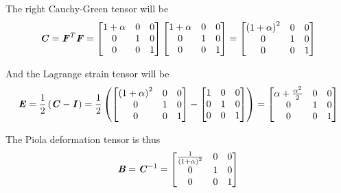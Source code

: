 The right Cauchy-Green tensor will be
\begin{equation}
  \boldsymbol{\mathit{C}} = {\boldsymbol{\mathit{F}}}^{T}\boldsymbol{\mathit{F}} = \begin{bmatrix}
    1+\alpha & 0 & 0 \\
    0 & 1 & 0 \\
    0 & 0 & 1
  \end{bmatrix} \begin{bmatrix}
    1+\alpha & 0 & 0 \\
    0 & 1 & 0 \\
    0 & 0 & 1
  \end{bmatrix} = \begin{bmatrix}
    \left( 1+\alpha \right)^2 & 0 & 0 \\
    0 & 1 & 0 \\
    0 & 0 & 1
  \end{bmatrix}
\end{equation}

And the Lagrange strain tensor will be
\begin{equation}
  \boldsymbol{\mathit{E}} = \frac{1}{2}\left( \boldsymbol{\mathit{C}}-\boldsymbol{\mathit{I}} \right) = \frac{1}{2}\left( \begin{bmatrix}
    \left( 1+\alpha \right)^2 & 0 & 0 \\
    0 & 1 & 0 \\
    0 & 0 & 1
  \end{bmatrix} - \begin{bmatrix}
    1 & 0 & 0 \\
    0 & 1 & 0 \\
    0 & 0 & 1
  \end{bmatrix} \right) = \begin{bmatrix}
    \alpha+\frac{\alpha^2}{2} & 0 & 0 \\
    0 & 1 & 0 \\
    0 & 0 & 1
  \end{bmatrix}
\end{equation}

The Piola deformation tensor is thus
\begin{equation}
  \boldsymbol{\mathit{B}} = {\boldsymbol{\mathit{C}}}^{-1} =  \begin{bmatrix}
    \frac{1}{\left( 1+\alpha \right)^2} & 0 & 0 \\
    0 & 1 & 0 \\
    0 & 0 & 1
  \end{bmatrix}
\end{equation}

